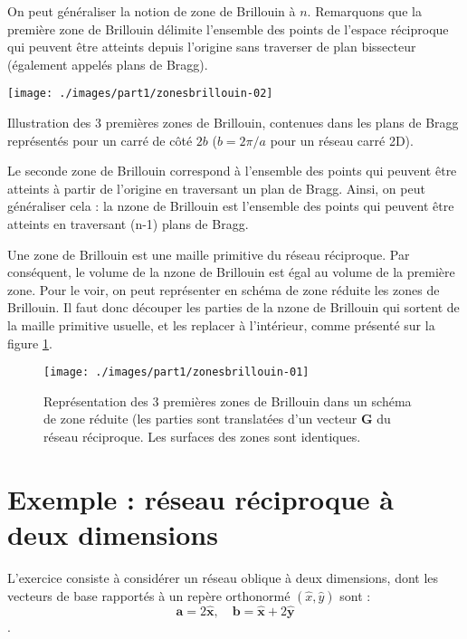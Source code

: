 On peut généraliser la notion de zone de Brillouin à $n$. Remarquons que la première zone de Brillouin délimite l'ensemble des points de l'espace réciproque qui peuvent être atteints depuis l'origine sans traverser de plan bissecteur (également appelés plans de Bragg).

\begin{marginfigure}
    \texttt{[image: ./images/part1/zonesbrillouin-02]}
    \caption{Illustration des 3 premières zones de Brillouin, contenues dans les plans de Bragg représentés pour un carré de côté $2b$ ($b=2\pi/a$ pour un réseau carré 2D).}
    \label{fig:constructionbrillouin}
\end{marginfigure}
Le seconde zone de Brillouin correspond à l'ensemble des points qui peuvent être atteints à partir de l'origine en traversant un plan de Bragg. Ainsi, on peut généraliser cela :
la n\ieme zone de Brillouin est l'ensemble des points qui peuvent être atteints en traversant (n-1) plans de Bragg.

Une zone de Brillouin est une maille primitive du réseau réciproque. Par conséquent, le volume de la n\ieme zone de Brillouin est égal au volume de la première zone. Pour le voir, on peut représenter en schéma de zone réduite les zones de Brillouin. Il faut donc découper les parties de la n\ieme zone de Brillouin qui sortent de la maille primitive usuelle, et les replacer à l'intérieur, comme présenté sur la figure \ref{fig:brillouinreduite}.

\begin{figure}
    \texttt{[image: ./images/part1/zonesbrillouin-01]}
    \caption{Représentation des 3 premières zones de Brillouin dans un schéma de zone réduite (les parties sont translatées d'un vecteur $\mathbf{G}$ du réseau réciproque. Les surfaces des zones sont identiques.}
    \label{fig:brillouinreduite}
\end{figure}

\section{Exemple : réseau réciproque à deux dimensions}

L'exercice consiste à considérer un réseau oblique à deux dimensions, dont les vecteurs de base rapportés à un repère orthonormé $(\hat{x},\hat{y})$ sont :
\begin{equation}
\mathbf{a} = 2\mathbf{\hat{x}},\quad \mathbf{b} = \mathbf{\hat{x}}+2\mathbf{\hat{y}}
\end{equation}.

